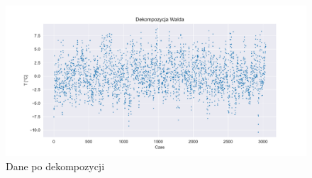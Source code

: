 \documentclass{article}
\theoremstyle{break}
\begin{document}
	\begin{figure}[H]
		\begin{center}
			\includegraphics[scale=0.63]{plot4.pdf}
			\caption{Dane po dekompozycji}
			\label{fig:p4}
		\end{center}
	\end{figure}
	
\end{document}
